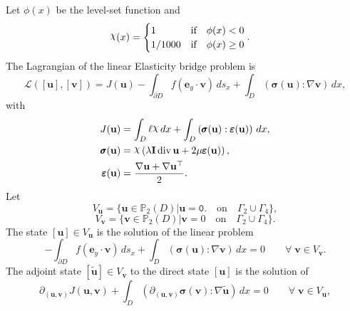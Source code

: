 \documentclass[preview]{standalone}
\let\oldcdot\cdot
\let\cdot\oldcdot
\begin{document}
Let $\phi(x)$ be the level-set function and
 \begin{align*}\raisebox{\depth}{$\chi$}(x) &= \begin{cases} 1 & \mbox{if}\quad \phi(x) < 0 \\ 1/1000 & \mbox{if}\quad \phi(x)  \ge 0 \end{cases}.\end{align*}
The Lagrangian of the linear Elasticity bridge problem is
\begin{dmath*}
\mathcal L(\left[ {\mathbf{ u }}\right],\left[ {\mathbf{ v }}\right]) = J({\mathbf{ u }}) -  \int_{\partial D} f \left( \mathbf e_y \cdot {\mathbf{ v }} \right) \,ds_x +  \int_{D} \left( \pmb \sigma({\mathbf{ u }}) \mathrel{:}  \nabla {\mathbf{ v }}  \right) \,dx , 
\end{dmath*}
with 
\begin{align*}
J({\mathbf{ u }}) &=  \int_{D} \ell \raisebox{\depth}{$\chi$} \,dx +  \int_{D} \left( \pmb \sigma({\mathbf{ u }}) \mathrel{:} \pmb \varepsilon({\mathbf{ u }}) \right) \,dx,\\
\pmb \sigma({\mathbf{ u }}) &= \raisebox{\depth}{$\chi$} \left(\lambda \mathbf{I} \operatorname{div} {\mathbf{ u }} + 2 \mu \pmb \varepsilon({\mathbf{ u }})\right),\\
\pmb \varepsilon({\mathbf{ u }}) &= \frac{ \nabla {\mathbf{ u }}  +   \nabla {\mathbf{ u }} ^\top }{2}.
 \end{align*}
Let
\begin{equation*}
V_{{\mathbf{ u }}} = \{ {\mathbf{ u }} \in \mathbb P_{2}(D)| {\mathbf{ u }} = \mathtt{\text{0.}}  \quad \text{{on}} \quad\Gamma_{2}\cup\Gamma_{4} \},\end{equation*}
\begin{equation*}
V_{{\mathbf{ v }}} = \{ {\mathbf{ v }} \in \mathbb P_{2}(D)| {\mathbf{ v }} = 0  \quad \text{{on}} \quad\Gamma_{2}\cup\Gamma_{4} \}.\end{equation*}
The state $\left[ {\mathbf{ u }}\right] \in  V_{{\mathbf{ u }}}$ is the solution of the linear problem
\begin{dmath*}
-  \int_{\partial D} f \left( \mathbf e_y \cdot {\mathbf{ v }} \right) \,ds_x +  \int_{D} \left( \pmb \sigma({\mathbf{ u }}) \mathrel{:}  \nabla {\mathbf{ v }}  \right) \,dx = 0\qquad \forall\; {{\mathbf{ v }}\in V_{{\mathbf{ v }}}} . 
\end{dmath*}
The adjoint state $\left[ \tilde{\mathbf{ u }}\right] \in  V_{{\mathbf{ v }}}$ to the direct state $\left[ {\mathbf{ u }}\right]$ is the solution of
\begin{dmath*}
\partial_{({\mathbf{ u }},{\mathbf{ v }})} J({\mathbf{ u }},{\mathbf{ v }}) +  \int_{D} \left( \partial_{({\mathbf{ u }},{\mathbf{ v }})} \pmb \sigma({\mathbf{ v }}) \mathrel{:}  \nabla \tilde{\mathbf{ u }}  \right) \,dx = 0\qquad \forall\; {{\mathbf{ v }}\in V_{{\mathbf{ u }}}} , 
\end{dmath*}
\end{document}
